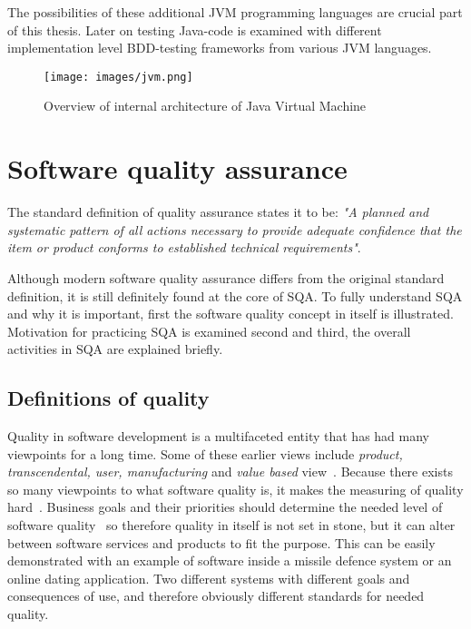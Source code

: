     The possibilities of these additional JVM programming languages are crucial part of this thesis. Later on testing Java-code is examined with
    different implementation level BDD-testing frameworks from various JVM languages.

    \begin{figure}[ht]
      \begin{center}
        \texttt{[image: images/jvm.png]}
        \caption{Overview of internal architecture of Java Virtual Machine}
        \label{fig:JVM}
      \end{center}
    \end{figure}

\section{Software quality assurance}
    The standard definition of quality assurance states it to be:
        \textit{"A planned and systematic pattern
        of all actions necessary to provide adequate confidence
        that the item or product conforms to established
        technical requirements"}.~\cite{buckley1978standard}

    Although modern software quality assurance differs from the original standard definition, it is still definitely found
    at the core of SQA. To fully understand SQA and why it is important, first the software quality concept in itself is illustrated.
    Motivation for practicing SQA is examined second and third, the overall activities in SQA are explained briefly.
    \subsection{Definitions of quality}
    Quality in software development is a multifaceted entity that has had many viewpoints for a long time.
    Some of these earlier views include \textit{product, transcendental, user, manufacturing} and \textit{value based} view~\cite{kitchenham1996elusive}.
    Because there exists so many viewpoints to what software quality is, it makes the measuring of quality hard~\cite{kitchenham1996elusive}.
    Business goals and their priorities should determine the needed level of software quality~\cite{kitchenham1996elusive} so therefore
    quality in itself is not set in stone, but it can alter between software services and products to fit the purpose.
    This can be easily demonstrated with an example of software inside a missile defence system or an online dating application.
    Two different systems with different goals and consequences of use, and therefore obviously different standards for needed quality.

